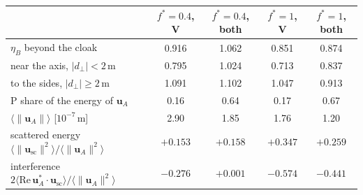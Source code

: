 \begin{tabular}{lcccc}
\toprule
 & $f^*=0.4$, V & $f^*=0.4$, both & $f^*=1$, V & $f^*=1$, both \\
\midrule
$\eta_B$ beyond the cloak & 0.916 & 1.062 & 0.851 & 0.874 \\
\quad near the axis, $|d_\perp|<2$\,m & 0.795 & 1.024 & 0.713 & 0.837 \\
\quad to the sides, $|d_\perp|\geq 2$\,m & 1.091 & 1.102 & 1.047 & 0.913 \\
P share of the energy of $\mathbf{u}_A$ & 0.16 & 0.64 & 0.17 & 0.67 \\
$\langle\|\mathbf{u}_A\|\rangle$ [$10^{-7}$\,m] & 2.90 & 1.85 & 1.76 & 1.20 \\
scattered energy $\langle\|\mathbf{u}_{\mathrm{sc}}\|^2\rangle/\langle\|\mathbf{u}_A\|^2\rangle$ & $+0.153$ & $+0.158$ & $+0.347$ & $+0.259$ \\
interference $2\langle\mathrm{Re}\,\mathbf{u}_A^*\!\cdot\mathbf{u}_{\mathrm{sc}}\rangle/\langle\|\mathbf{u}_A\|^2\rangle$ & $-0.276$ & $+0.001$ & $-0.574$ & $-0.441$ \\
\bottomrule
\end{tabular}
